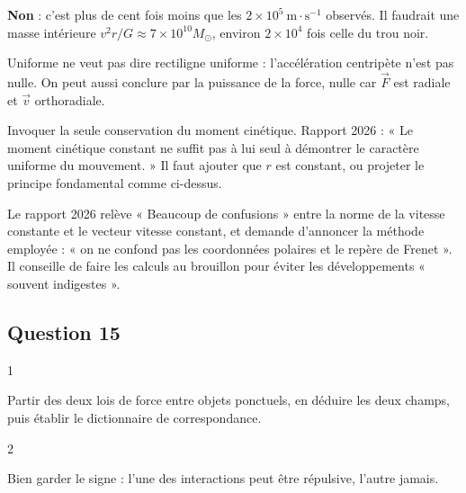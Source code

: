 \documentclass[11pt,a4paper]{article}
\begin{document}
\textbf{Non} : c'est plus de cent fois moins que les \(2\times10^5\ \mathrm{m\cdot s^{-1}}\) observés. Il faudrait une masse intérieure \(v^2r/G\approx7\times10^{10}M_\odot\), environ \(2\times10^4\) fois celle du trou noir.

\begin{piege}

Uniforme ne veut pas dire rectiligne uniforme : l'accélération centripète n'est pas nulle. On peut aussi conclure par la puissance de la force, nulle car \(\vec F\) est radiale et \(\vec v\) orthoradiale.

\end{piege}

\begin{piege}

Invoquer la seule conservation du moment cinétique. Rapport 2026 : « Le moment cinétique constant ne suffit pas à lui seul à démontrer le caractère uniforme du mouvement. » Il faut ajouter que \(r\) est constant, ou projeter le principe fondamental comme ci-dessus.

\end{piege}

\begin{jury}

Le rapport 2026 relève « Beaucoup de confusions » entre la norme de la vitesse constante et le vecteur vitesse constant, et demande d'annoncer la méthode employée : « on ne confond pas les coordonnées polaires et le repère de Frenet ». Il conseille de faire les calculs au brouillon pour éviter les développements « souvent indigestes ».

\end{jury}

\hypertarget{question-15}{%
\subsection{Question 15}\label{question-15}}

\begin{indication}{1}

Partir des deux lois de force entre objets ponctuels, en déduire les deux champs, puis établir le dictionnaire de correspondance.

\end{indication}

\begin{indication}{2}

Bien garder le signe : l'une des interactions peut être répulsive, l'autre jamais.

\end{indication}
\end{document}
